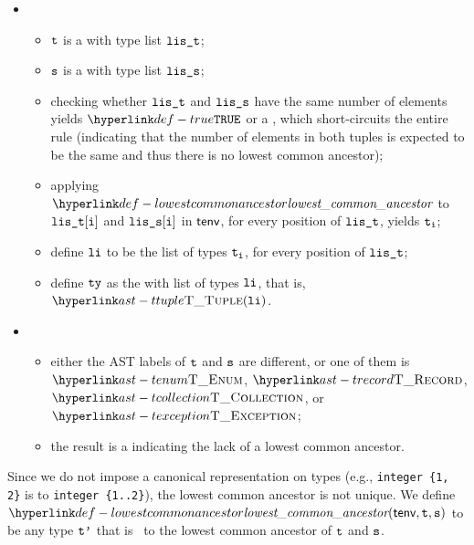 \begin{itemize}
\begin{itemize}
\begin{itemize}
      \item {}
      \begin{itemize}
        \item $\vt$ is a \tupletypeterm{} with type list $\vlit$;
        \item $\vs$ is a \tupletypeterm{} with type list $\vlis$;
        \item checking whether $\vlit$ and $\vlis$ have the same number of elements yields $\True$
              or a \typingerrorterm{}, which short-circuits the entire rule (indicating that the number of elements in both tuples is expected
              to be the same and thus there is no lowest common ancestor);
        \item applying $\lca$ to $\vlit[\vi]$ and $\vlis[\vi]$ in $\tenv$, for every position of $\vlit$,
              yields $\vt_\vi$\ProseOrTypeError;
        \item define $\vli$ to be the list of types $\vt_\vi$, for every position of $\vlit$;
        \item define $\tty$ as the \tupletypeterm{} with list of types $\vli$, that is, $\TTuple(\vli)$.
      \end{itemize}

      \item {}
      \begin{itemize}
        \item either the AST labels of $\vt$ and $\vs$ are different, or one of them is $\TEnum$, $\TRecord$, $\TCollection$, or $\TException$;
        \item the result is a \typingerrorterm{} indicating the lack of a lowest common ancestor.
      \end{itemize}
    \end{itemize}
  \end{itemize}
\end{itemize}

\FormallyParagraph
Since we do not impose a canonical representation on types (e.g., \verb|integer {1, 2}| is \typeequivalent{} to \verb|integer {1..2}|),
the lowest common ancestor is not unique.
We define $\lca(\tenv, \vt, \vs)$ to be any type $\vtp$ that is \typeequivalent\ to the lowest common ancestor of $\vt$ and $\vs$.

\begin{mathpar}
\end{mathpar}


